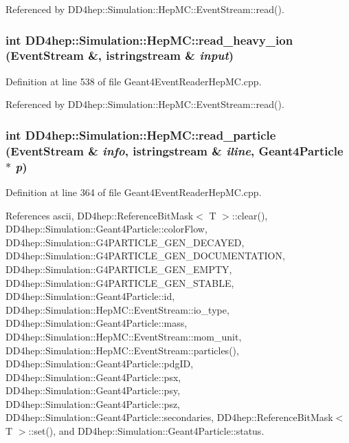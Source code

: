 Referenced by DD4hep::Simulation::HepMC::EventStream::read().\hypertarget{namespace_d_d4hep_1_1_simulation_1_1_hep_m_c_a973a0fe661658598d3982e072e11f77d}{
\subsubsection[{read\_\-heavy\_\-ion}]{\setlength{\rightskip}{0pt plus 5cm}int DD4hep::Simulation::HepMC::read\_\-heavy\_\-ion (EventStream \&, \/  istringstream \& {\em input})}}
\label{namespace_d_d4hep_1_1_simulation_1_1_hep_m_c_a973a0fe661658598d3982e072e11f77d}


Definition at line 538 of file Geant4EventReaderHepMC.cpp.

Referenced by DD4hep::Simulation::HepMC::EventStream::read().\hypertarget{namespace_d_d4hep_1_1_simulation_1_1_hep_m_c_ab38b9307ace39b3227306e907c3f6840}{
\subsubsection[{read\_\-particle}]{\setlength{\rightskip}{0pt plus 5cm}int DD4hep::Simulation::HepMC::read\_\-particle (EventStream \& {\em info}, \/  istringstream \& {\em iline}, \/  {\bf Geant4Particle} $\ast$ {\em p})}}
\label{namespace_d_d4hep_1_1_simulation_1_1_hep_m_c_ab38b9307ace39b3227306e907c3f6840}


Definition at line 364 of file Geant4EventReaderHepMC.cpp.

References ascii, DD4hep::ReferenceBitMask$<$ T $>$::clear(), DD4hep::Simulation::Geant4Particle::colorFlow, DD4hep::Simulation::G4PARTICLE\_\-GEN\_\-DECAYED, DD4hep::Simulation::G4PARTICLE\_\-GEN\_\-DOCUMENTATION, DD4hep::Simulation::G4PARTICLE\_\-GEN\_\-EMPTY, DD4hep::Simulation::G4PARTICLE\_\-GEN\_\-STABLE, DD4hep::Simulation::Geant4Particle::id, DD4hep::Simulation::HepMC::EventStream::io\_\-type, DD4hep::Simulation::Geant4Particle::mass, DD4hep::Simulation::HepMC::EventStream::mom\_\-unit, DD4hep::Simulation::HepMC::EventStream::particles(), DD4hep::Simulation::Geant4Particle::pdgID, DD4hep::Simulation::Geant4Particle::psx, DD4hep::Simulation::Geant4Particle::psy, DD4hep::Simulation::Geant4Particle::psz, DD4hep::Simulation::Geant4Particle::secondaries, DD4hep::ReferenceBitMask$<$ T $>$::set(), and DD4hep::Simulation::Geant4Particle::status.

